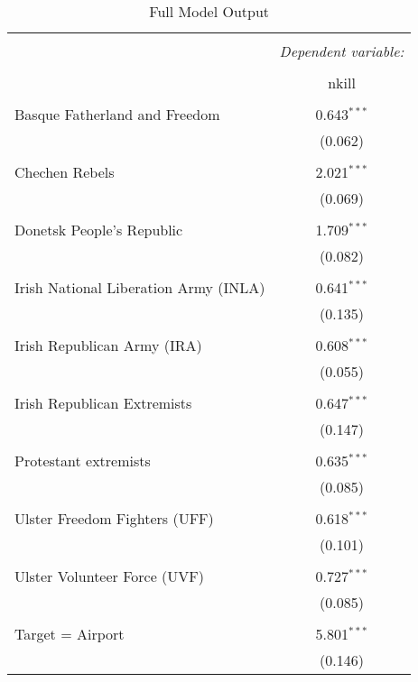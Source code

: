 
\begin{table}[!htbp] \centering 
  \caption{Full Model Output} 
  \label{} 
\begin{tabular}{@{\extracolsep{0.1pt}}lc} 
\\[-1.8ex]\hline 
\hline \\[-1.8ex] 
 & \multicolumn{1}{c}{\textit{Dependent variable:}} \\ 
\cline{2-2} 
\\[-1.8ex] & nkill \\ 
\hline \\[-1.8ex] 
 Basque Fatherland and Freedom & 0.643$^{***}$ \\ 
  & (0.062) \\ 
  & \\ 
 Chechen Rebels & 2.021$^{***}$ \\ 
  & (0.069) \\ 
  & \\ 
 Donetsk People's Republic & 1.709$^{***}$ \\ 
  & (0.082) \\ 
  & \\ 
 Irish National Liberation Army (INLA) & 0.641$^{***}$ \\ 
  & (0.135) \\ 
  & \\ 
 Irish Republican Army (IRA) & 0.608$^{***}$ \\ 
  & (0.055) \\ 
  & \\ 
 Irish Republican Extremists & 0.647$^{***}$ \\ 
  & (0.147) \\ 
  & \\ 
 Protestant extremists & 0.635$^{***}$ \\ 
  & (0.085) \\ 
  & \\ 
 Ulster Freedom Fighters (UFF) & 0.618$^{***}$ \\ 
  & (0.101) \\ 
  & \\ 
 Ulster Volunteer Force (UVF) & 0.727$^{***}$ \\ 
  & (0.085) \\ 
  & \\ 
 Target = Airport & 5.801$^{***}$ \\ 
  & (0.146) \\ 

\end{tabular}
\end{table}
